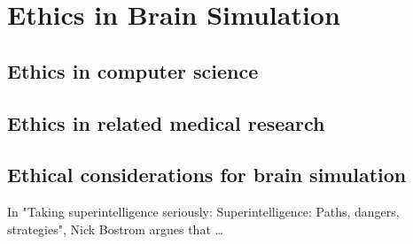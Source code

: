 \section{Ethics in Brain Simulation}

\subsection{Ethics in computer science}


\subsection{Ethics in related medical research}


\subsection{Ethical considerations for brain simulation}

In "Taking superintelligence seriously: Superintelligence: Paths, dangers,
strategies", Nick Bostrom argues that \ldots \autocite{bostrom_superintelligence_2014}

